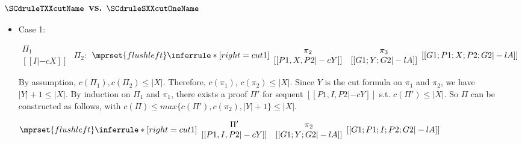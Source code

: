 \subsubsection{$\SCdruleTXXcutName$ vs. $\SCdruleSXXcutOneName$}
\begin{itemize}
\item Case 1:
      \begin{center}
        \scriptsize
        \begin{math}
          \begin{array}{c}
            \Pi_1 \\
            {[[I |-c X]]}
          \end{array}
        \end{math}
        \qquad\qquad
        $\Pi_2:$
        \begin{math}
          $$\mprset{flushleft}
          \inferrule* [right={\tiny cut1}] {
            {
              \begin{array}{cc}
                \pi_2 & \pi_3 \\
                {[[P1, X, P2 |-c Y]]} & {[[G1; Y; G2 |-l A]]}
              \end{array}
            }
          }{[[G1; P1; X; P2; G2 |-l A]]}
        \end{math}
      \end{center}
      By assumption, $c(\Pi_1),c(\Pi_2)\leq |X|$. Therefore, $c(\pi_1)$,
      $c(\pi_2)\leq |X|$. Since $Y$ is the cut formula on $\pi_1$ and
      $\pi_2$, we have $|Y|+1\leq|X|$. By induction on $\Pi_1$ and $\pi_1$,
      there exists a proof $\Pi'$ for sequent $[[P1, I, P2 |-c Y]]$ s.t.
      $c(\Pi')\leq|X|$. So $\Pi$ can be constructed as follows, with
      $c(\Pi)\leq max\{c(\Pi'),c(\pi_2),|Y|+1\}\leq |X|$.
      \begin{center}
        \scriptsize
        \begin{math}
          $$\mprset{flushleft}
          \inferrule* [right={\tiny cut1}] {
            {
              \begin{array}{cc}
                \Pi' & \pi_2 \\
                {[[P1, I, P2 |-c Y]]} & {[[G1; Y; G2 |-l A]]}
              \end{array}
            }
          }{[[G1; P1; I; P2; G2 |-l A]]}
        \end{math}
      \end{center}


\end{itemize}
